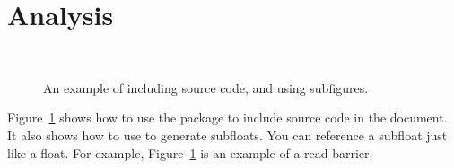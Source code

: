\section{Analysis}
\label{sec:analysis}



\begin{figure}
  \centering
  \\
  \caption{An example of including source code, and using subfigures.}
  \label{fig:code}
\end{figure}

Figure~\ref{fig:code} shows how to use the  package
to include source code in the document.  It also shows how to use
 to generate subfloats.  You can reference a subfloat
just like a float.  For example,
Figure~\ref{fig:code} is an example of a read
barrier.

